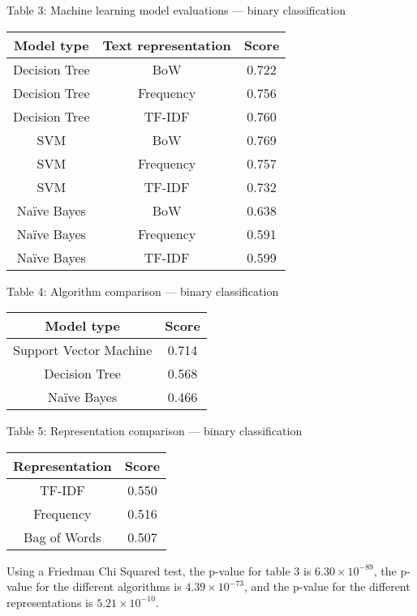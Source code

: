 \documentclass{article}
\begin{document}
\begin{center}
Table 3: Machine learning model evaluations --- binary classification
\begin{tabular}{ |c|c|c| }
\hline {\bf Model type} & {\bf Text representation} & {\bf Score}\\
\hline Decision Tree & BoW & 0.722\\
\hline Decision Tree & Frequency & 0.756\\
\hline Decision Tree & TF-IDF & 0.760\\
\hline SVM & BoW & 0.769\\
\hline SVM & Frequency & 0.757\\
\hline SVM & TF-IDF & 0.732\\
\hline Naïve Bayes & BoW & 0.638\\
\hline Naïve Bayes & Frequency & 0.591\\
\hline Naïve Bayes & TF-IDF & 0.599\\
\hline
\end{tabular}
\end{center}

\begin{center}
Table 4: Algorithm comparison --- binary classification\\
\begin{tabular}{ |c|c| }
\hline {\bf Model type}& {\bf Score}\\
\hline Support Vector Machine & 0.714\\
\hline Decision Tree & 0.568\\
\hline Naïve Bayes & 0.466\\
\hline
\end{tabular}
\end{center}

\begin{center}
Table 5: Representation comparison --- binary classification\\
\begin{tabular}{ |c|c| }
\hline {\bf Representation}& {\bf Score}\\
\hline TF-IDF & 0.550\\
\hline Frequency & 0.516\\
\hline Bag of Words & 0.507\\
\hline
\end{tabular}
\end{center}

Using a Friedman Chi Squared test, the p-value for table 3 is $6.30 \times 10^{-89}$, the p-value for the different algorithms is $4.39 \times 10^{-73}$, and the p-value for the different representations is $5.21 \times 10^{-10}$.
\end{document}
